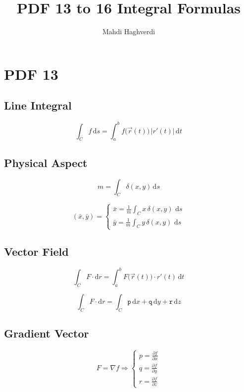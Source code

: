 \documentclass[12pt, fleqn]{book}
\title{PDF 13 to 16 Integral Formulas}
\author{Mahdi Haghverdi}
\begin{document}
	\maketitle
	\tableofcontents
	
\chapter{PDF 13}\label{pdf13}
	\section{Line Integral}
	\begin{equation}
		\int_{C} f \, \mathrm{d}s = \int_{a}^{b} f\big(\vec{r}(t)\big) \, \lvert r'(t) \lvert \, \mathrm{d}t
	\end{equation}		

	\section{Physical Aspect}
		\begin{equation}
			m = \int_{C} \delta (x, y) \, \mathrm{d}s
		\end{equation}
		
		\begin{equation}
			(\bar{x}, \bar{y}) = 
			\begin{cases}
					\bar{x} = \frac{1}{m} \int_{C} x \, \delta(x, y) \, \, \mathrm{d}s \\
					\bar{y} = \frac{1}{m} \int_{C} y \, \delta(x, y) \, \, \mathrm{d}s
			\end{cases}
		\end{equation}
	
	\section{Vector Field}
		\begin{equation}
			\int_{C} F \cdot \mathrm{d}r = \int_{a}^{b} F\big(\vec{r}(t)\big) \cdot r'(t) \, \mathrm{d}t
		\end{equation}
		
		\begin{equation}
			\int_{C} F \cdot \mathrm{d}r = \int_{C} \mathtt{p} \, \mathrm{d}x + \mathtt{q} \, \mathrm{d}y + \mathtt{r} \, \mathrm{d}z
		\end{equation}
	
    \section{Gradient Vector}
    	\begin{equation}
    		F = \nabla f \Rightarrow
    		\begin{cases}
    			p = \frac{\partial f}{\partial x} \\
    			q = \frac{\partial f}{\partial y} \\
    			r = \frac{\partial f}{\partial z} 
    		\end{cases}
    	\end{equation} 
    	
\end{document}
